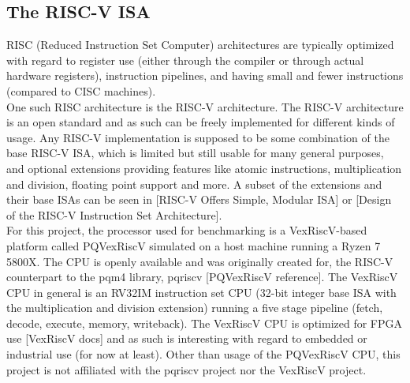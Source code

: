\subsection{The RISC-V ISA}
RISC (Reduced Instruction Set Computer) architectures are typically optimized with regard to register use (either through the compiler or through actual hardware registers), instruction pipelines, and having small and fewer instructions (compared to CISC machines).\medskip\\
One such RISC architecture is the RISC-V architecture. The RISC-V architecture is an open standard and as such can be freely implemented for different kinds of usage. Any RISC-V implementation is supposed to be some combination of the base RISC-V ISA, which is limited but still usable for many general purposes, and optional extensions providing features like atomic instructions, multiplication and division, floating point support and more. A subset of the extensions and their base ISAs can be seen in [RISC-V Offers Simple, Modular ISA] or [Design of the RISC-V Instruction Set Architecture].
\medskip\\
For this project, the processor used for benchmarking is a VexRiscV-based platform called PQVexRiscV simulated on a host machine running a Ryzen 7 5800X. The CPU is openly available and was originally created for, the RISC-V counterpart to the pqm4 library, pqriscv [PQVexRiscV reference]. The VexRiscV CPU in general is an RV32IM instruction set CPU (32-bit integer base ISA with the multiplication and division extension) running a five stage pipeline (fetch, decode, execute, memory, writeback). The VexRiscV CPU is optimized for FPGA use [VexRiscV docs] and as such is interesting with regard to embedded or industrial use (for now at least). Other than usage of the PQVexRiscV CPU, this project is not affiliated with the pqriscv project nor the VexRiscV project.